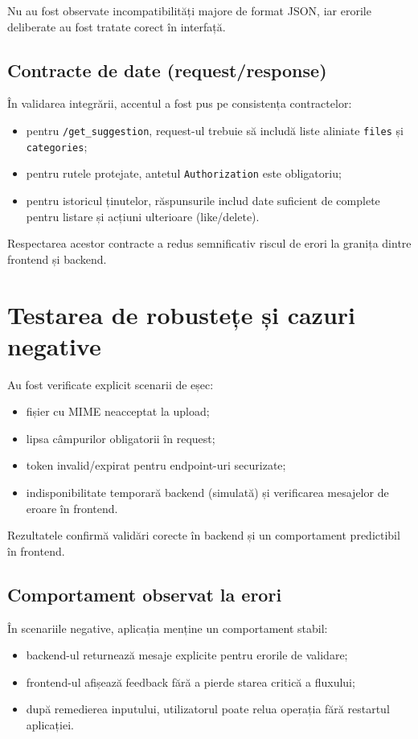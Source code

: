 Nu au fost observate incompatibilități majore de format JSON, iar erorile deliberate au fost tratate corect în interfață.

\subsection{Contracte de date (request/response)}
În validarea integrării, accentul a fost pus pe consistența contractelor:
\begin{itemize}
    \item pentru \texttt{/get\_suggestion}, request-ul trebuie să includă liste aliniate \texttt{files} și \texttt{categories};
    \item pentru rutele protejate, antetul \texttt{Authorization} este obligatoriu;
    \item pentru istoricul ținutelor, răspunsurile includ date suficient de complete pentru listare și acțiuni ulterioare (like/delete).
\end{itemize}

Respectarea acestor contracte a redus semnificativ riscul de erori la granița dintre frontend și backend.

\section{Testarea de robustețe și cazuri negative}
Au fost verificate explicit scenarii de eșec:
\begin{itemize}
    \item fișier cu MIME neacceptat la upload;
    \item lipsa câmpurilor obligatorii în request;
    \item token invalid/expirat pentru endpoint-uri securizate;
    \item indisponibilitate temporară backend (simulată) și verificarea mesajelor de eroare în frontend.
\end{itemize}

Rezultatele confirmă validări corecte în backend și un comportament predictibil în frontend.

\subsection{Comportament observat la erori}
În scenariile negative, aplicația menține un comportament stabil:
\begin{itemize}
    \item backend-ul returnează mesaje explicite pentru erorile de validare;
    \item frontend-ul afișează feedback fără a pierde starea critică a fluxului;
    \item după remedierea inputului, utilizatorul poate relua operația fără restartul aplicației.
\end{itemize}

